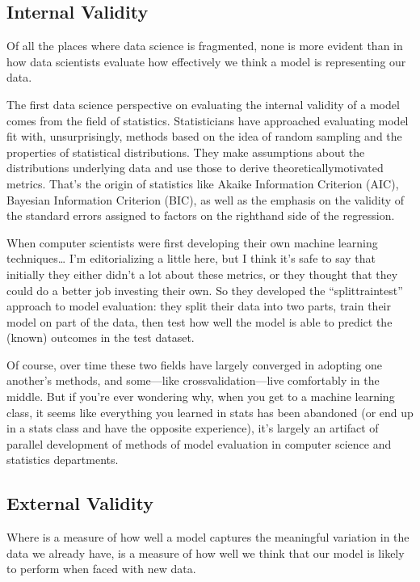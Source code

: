 \documentclass[letterpaper,10pt,english]{jupyterBook}
\begin{document}
\subsection{Internal Validity}
\label{\detokenize{30_questions/20_passive_prediction_questions:internal-validity}}
\sphinxAtStartPar
Of all the places where data science is fragmented, none is more evident than in how data scientists evaluate how effectively we think a model is representing our data.

\sphinxAtStartPar
The first data science perspective on evaluating the internal validity of a model comes from the field of statistics. Statisticians have approached evaluating model fit with, unsurprisingly, methods based on the idea of random sampling and the properties of statistical distributions. They make assumptions about the distributions underlying data and use those to derive theoretically\sphinxhyphen{}motivated metrics. That’s the origin of statistics like Akaike Information Criterion (AIC), Bayesian Information Criterion (BIC), as well as the emphasis on the validity of the standard errors assigned to factors on the right\sphinxhyphen{}hand side of the regression.

\sphinxAtStartPar
When computer scientists were first developing their own machine learning techniques… I’m editorializing a little here, but I think it’s safe to say that initially they either didn’t  a lot about these metrics, or they thought that they could do a better job investing their own. So they developed the “split\sphinxhyphen{}train\sphinxhyphen{}test” approach to model evaluation: they split their data into two parts, train their model on part of the data, then test how well the model is able to predict the (known) outcomes in the test dataset.

\sphinxAtStartPar
Of course, over time these two fields have largely converged in adopting one another’s methods, and some—like cross\sphinxhyphen{}validation—live comfortably in the middle. But if you’re ever wondering why, when you get to a machine learning class, it seems like everything you learned in stats has been abandoned (or end up in a stats class and have the opposite experience), it’s largely an artifact of parallel development of methods of model evaluation in computer science and statistics departments.


\subsection{External Validity}
\label{\detokenize{30_questions/20_passive_prediction_questions:external-validity}}
\sphinxAtStartPar
Where  is a measure of how well a model captures the meaningful variation in the data we already have,  is a measure of how well we think that our model is likely to perform when faced with new data.
\end{document}
